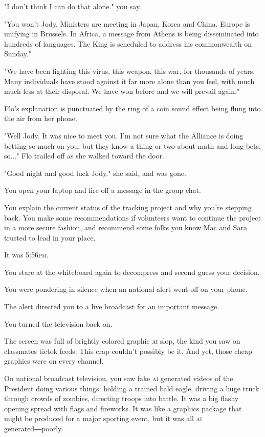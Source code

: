 \documentclass[a5paper, symmetric]{tufte-book}
\begin{document}
"I don't think I can do that alone." you say. 

"You won't Jody, Ministers are meeting in Japan, Korea and China. Europe is unifying in Brussels. In Africa, a message from Athens is being disseminated into hundreds of languages. The King is scheduled to address his commonwealth on Sunday."

"We have been fighting this virus, this weapon, this war, for thousands of years. Many individuals have stood against it far more alone than you feel, with much much less at their disposal. We have won before and we will prevail again."

Flo's explanation is punctuated by the ring of a coin sound effect being flung into the air from her phone. 

"Well Jody. It was nice to meet you. I'm not sure what the Alliance is doing betting so much on you, but they know a thing or two about math and long bets, so..." Flo trailed off as she walked toward the door. 

"Good night and good luck Jody." she said, and was gone. 

You open your laptop and fire off a message in the group chat.

You explain the current status of the tracking project and why you're stepping back. You make some recommendations if volunteers want to continue the project in a more secure fashion, and recommend some folks you know Mac and Sara trusted to lead in your place. 

It was 5:56\textsc{pm}.

You stare at the whiteboard again to decompress and second guess your decision. 

You were pondering in silence when an national alert went off on your phone. 

The alert directed you to a live broadcast for an important message. 

You turned the television back on. 

The screen was full of brightly colored graphic \textsc{ai} slop, the kind you saw on classmates tictok feeds. This crap couldn't possibly be it. And yet, those cheap graphics were on every channel. 

On national broadcast television, you saw fake \textsc{ai} generated videos of the President doing various things: holding a trained bald eagle, driving a huge truck through crowds of zombies, directing troops into battle. It was a big flashy opening spread with flags and fireworks. It was like a graphics package that might be produced for a major sporting event, but it was all \textsc{ai} generated―poorly. 
\end{document}
